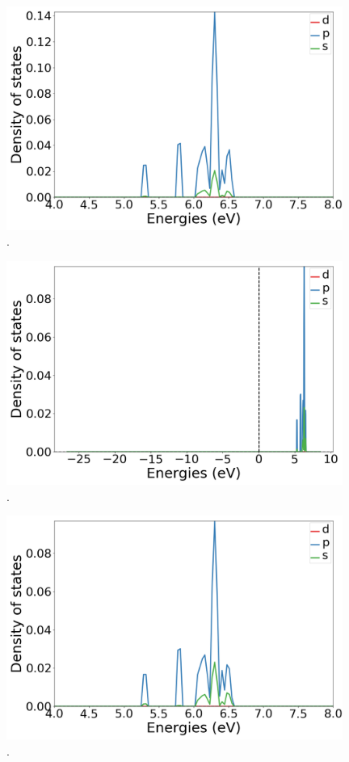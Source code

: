 \documentclass{article}
\begin{document}
  \begin{figure}[H]
      \centering
      \includegraphics[width = 11cm]{../fig/DOS_k4_LDOS25_2.png}
      \caption{. }
      \label{fig:DOS_k4_LDOS25_2}
  \end{figure}

  \begin{figure}[H]
      \centering
      \includegraphics[width = 11cm]{../fig/DOS_k4_LDOS26_1.png}
      \caption{. }
      \label{fig:DOS_k4_LDOS26_1}
  \end{figure}

  \begin{figure}[H]
      \centering
      \includegraphics[width = 11cm]{../fig/DOS_k4_LDOS26_2.png}
      \caption{. }
      \label{fig:DOS_k4_LDOS26_2}
  \end{figure}
\end{document}

